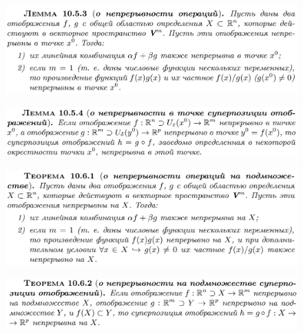 \documentclass{article}
\begin{document}
\begin{figure}[h!]
    \centering
    \includegraphics[width=\textwidth]{27.png}
    \vspace{-1cm}
\end{figure}
\newpage
\begin{figure}[h!]
    \centering
    \includegraphics[width=\textwidth]{28.png}
    \vspace{-1cm}
\end{figure}
\begin{figure}[h!]
    \centering
    \vspace{-1cm}
\end{figure}
\begin{figure}[h!]
    \centering
    \includegraphics[width=\textwidth]{30.png}
    \vspace{-1cm}
\end{figure}
\begin{figure}[h!]
    \centering
    \includegraphics[width=\textwidth]{31.png}
    \vspace{-1cm}
\end{figure}
\end{document}
